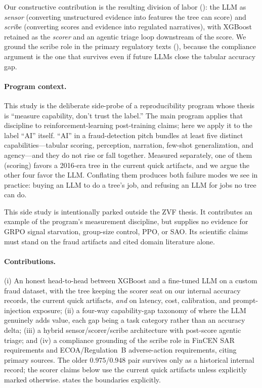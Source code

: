 Our constructive contribution is the resulting division of labor
(): the LLM as \emph{sensor} (converting
unstructured evidence into features the tree can score) and \emph{scribe}
(converting scores and evidence into regulated narratives), with XGBoost
retained as the \emph{scorer} and an agentic triage loop downstream of the
score. We ground the scribe role in the primary regulatory texts
(), because the compliance argument is the one that
survives even if future LLMs close the tabular accuracy gap.

\paragraph{Program context.} This study is the deliberate side-probe of a
reproducibility program whose thesis is ``measure capability, don't trust the
label.'' The main program applies that discipline to reinforcement-learning
post-training claims; here we apply it to the label ``AI'' itself. ``AI'' in a
fraud-detection pitch bundles at least five distinct capabilities---tabular
scoring, perception, narration, few-shot generalization, and agency---and they
do not rise or fall together. Measured separately, one of them (scoring)
favors a 2016-era tree in the current quick artifacts, and we argue the other four
favor the LLM. Conflating them produces both failure
modes we see in practice: buying an LLM to do a tree's job, and refusing an LLM
for jobs no tree can do.

This side study is intentionally parked outside the ZVF thesis. It contributes
an example of the program's measurement discipline, but supplies no evidence for
GRPO signal starvation, group-size control, PPO, or SAO. Its scientific claims
must stand on the fraud artifacts and cited domain literature alone.

\paragraph{Contributions.}
(i) An honest head-to-head between XGBoost and a fine-tuned LLM on a custom
fraud dataset, with the tree keeping the scorer seat on our internal accuracy
records, the current quick artifacts, \emph{and} on
latency, cost, calibration, and prompt-injection exposure;
(ii) a four-way capability-gap taxonomy of where the LLM genuinely adds value,
each gap being a task category rather than an accuracy delta;
(iii) a hybrid sensor/scorer/scribe architecture with post-score agentic
triage; and
(iv) a compliance grounding of the scribe role in FinCEN SAR requirements and
ECOA/Regulation~B adverse-action requirements, citing primary sources.
The older $0.975$/$0.948$ pair survives only as a historical internal record;
the scorer claims below use the current quick artifacts unless explicitly
marked otherwise.  states the boundaries
explicitly.
